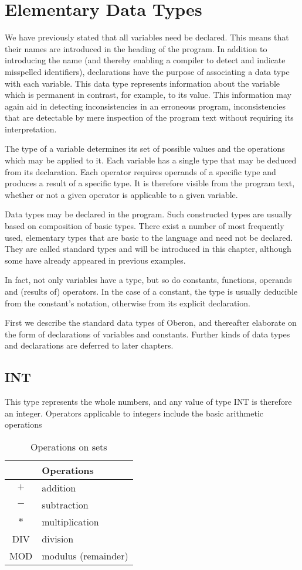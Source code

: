 \chapter{Elementary Data Types}
We have previously stated that all variables need be declared. This means that their names are
introduced in the heading of the program. In addition to introducing the name (and thereby enabling
a compiler to detect and indicate misspelled identifiers), declarations have the purpose of
associating a data type with each variable. This data type represents information about the variable
which is permanent in contrast, for example, to its value. This information may again aid in
detecting inconsistencies in an erroneous program, inconsistencies that are detectable by mere
inspection of the program text without requiring its interpretation.

The type of a variable determines its set of possible values and the operations which may be
applied to it. Each variable has a single type that may be deduced from its declaration. Each
operator requires operands of a specific type and produces a result of a specific type. It is therefore
visible from the program text, whether or not a given operator is applicable to a given variable.

Data types may be declared in the program. Such constructed types are usually based on
composition of basic types. There exist a number of most frequently used, elementary types that
are basic to the language and need not be declared. They are called standard types and will be
introduced in this chapter, although some have already appeared in previous examples.

In fact, not only variables have a type, but so do constants, functions, operands and (results of)
operators. In the case of a constant, the type is usually deducible from the constant's notation,
otherwise from its explicit declaration.

First we describe the standard data types of Oberon, and thereafter elaborate on the form of
declarations of variables and constants. Further kinds of data types and declarations are deferred
to later chapters.

\section{INT}
This type represents the whole numbers, and any value of type INT is therefore an integer.
Operators applicable to integers include the basic arithmetic operations
\begin{table}[h!]
  \centering
  \begin{tabular}{c|l}
        & Operations \\\hline
    $+$ & addition \\
    $-$ & subtraction \\
    $*$ & multiplication \\
    DIV & division \\
    MOD & modulus (remainder)
  \end{tabular}
  \caption{Operations on sets}
\end{table}

